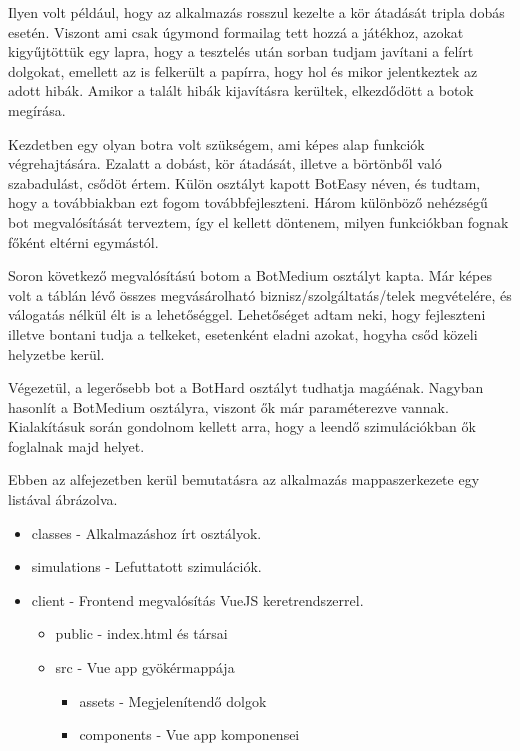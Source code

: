 Ilyen volt például, hogy az alkalmazás rosszul kezelte a kör átadását tripla dobás esetén. Viszont ami csak úgymond formailag tett hozzá a játékhoz, azokat kigyűjtöttük egy lapra, hogy a tesztelés után sorban tudjam javítani a felírt dolgokat, emellett az is felkerült a papírra, hogy hol és mikor jelentkeztek az adott hibák. Amikor a talált hibák kijavításra kerültek, elkezdődött a botok megírása.

Kezdetben egy olyan botra volt szükségem, ami képes alap funkciók végrehajtására. Ezalatt a dobást, kör átadását, illetve a börtönből való szabadulást, csődöt értem. Külön osztályt kapott BotEasy néven, és tudtam, hogy a továbbiakban ezt fogom továbbfejleszteni. Három különböző nehézségű bot megvalósítását terveztem, így el kellett döntenem, milyen funkciókban fognak főként eltérni egymástól.

Soron következő megvalósítású botom a BotMedium osztályt kapta. Már képes volt a táblán lévő összes megvásárolható biznisz/szolgáltatás/telek megvételére, és válogatás nélkül élt is a lehetőséggel. Lehetőséget adtam neki, hogy fejleszteni illetve bontani tudja a telkeket, esetenként eladni azokat, hogyha csőd közeli helyzetbe kerül.

Végezetül, a legerősebb bot a BotHard osztályt tudhatja magáénak. Nagyban hasonlít a BotMedium osztályra, viszont ők már paraméterezve vannak. Kialakításuk során gondolnom kellett arra, hogy a leendő szimulációkban ők foglalnak majd helyet.

\newpage
{}

Ebben az alfejezetben kerül bemutatásra az alkalmazás mappaszerkezete egy listával ábrázolva.

\renewcommand{\labelitemi}{$\blacksquare$}
 \renewcommand\labelitemii{$\square$}
 \begin{itemize}
   \item  classes - Alkalmazáshoz írt osztályok.
   \item simulations - Lefuttatott szimulációk.
\item client - Frontend megvalósítás VueJS keretrendszerrel.

   \begin{itemize}
     \item  public - index.html és társai
     \item src - Vue app gyökérmappája
     \begin{itemize}
       \item  assets - Megjelenítendő dolgok
	\item components - Vue app komponensei

     \end{itemize}
   \end{itemize}
 \end{itemize}
